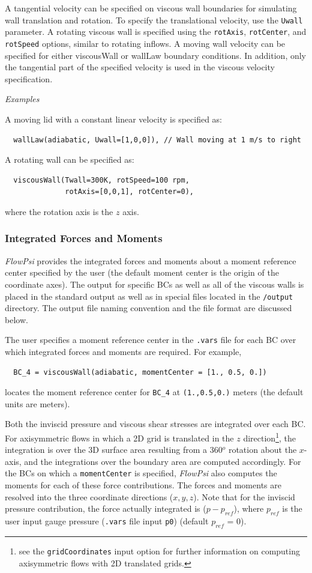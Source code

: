 \documentclass{article}
\begin{document}
A tangential velocity can be specified on viscous wall boundaries for
simulating wall translation and rotation.  To specify the translational
velocity, use the {\tt Uwall} parameter.  A rotating viscous wall is
specified using the {\tt rotAxis}, {\tt rotCenter}, and {\tt rotSpeed}
options, similar to rotating inflows.  A moving wall velocity
can be specified for either viscousWall or wallLaw boundary
conditions.  In addition, only the tangential part of the specified
velocity is used in the viscous velocity specification.  

{\center \it Examples}

A moving lid with a constant linear velocity is specified as:
\begin{verbatim}
  wallLaw(adiabatic, Uwall=[1,0,0]), // Wall moving at 1 m/s to right
\end{verbatim}
A rotating wall can be specified as:
\begin{verbatim}
  viscousWall(Twall=300K, rotSpeed=100 rpm, 
              rotAxis=[0,0,1], rotCenter=0),
\end{verbatim}
where the rotation axis is the $z$ axis.


\subsubsection{Integrated Forces and Moments}
\label{integrated_fm}

{\em FlowPsi} provides the integrated forces and moments about a moment
reference center specified by the user (the default moment center is
the origin of the coordinate axes).  The output for specific BCs as
well as all of the viscous walls is placed in the standard output as
well as in special files located in the \verb!/output! directory.  The
output file naming convention and the file format are discussed below.

The user specifies a moment reference center in the \verb!.vars! file for each BC over which integrated forces and moments are required.  For example,
\begin{verbatim}
  BC_4 = viscousWall(adiabatic, momentCenter = [1., 0.5, 0.])
\end{verbatim}
locates the moment reference center for \verb!BC_4! at \verb!(1.,0.5,0.)! meters (the default units are meters).

Both the inviscid pressure and viscous shear stresses are integrated
over each BC.  For axisymmetric flows in which a 2D grid is translated
in the $z$ direction\footnote{see the {\tt gridCoordinates} input
  option for further information on computing axisymmetric flows with
  2D translated grids.}, the integration is over the 3D surface area
resulting from a 360$^o$ rotation about the $x$-axis, and the
integrations over the boundary area are computed accordingly.  For the
BCs on which a \verb!momentCenter! is specified, {\em FlowPsi} also
computes the moments for each of these force contributions.  The
forces and moments are resolved into the three coordinate directions
($x,y,z$).  Note that for the inviscid pressure contribution, the
force actually integrated is ({\it{$p - p_{ref}$}}), where $p_{ref}$
is the user input gauge pressure ({\tt .vars} file input {\tt p0})
(default $p_{ref}$ = 0).
\end{document}
